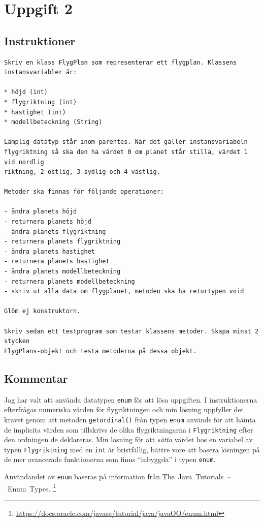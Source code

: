 \section{Uppgift 2}\label{sec:uppg02}

\subsection{Instruktioner}
\begin{Verbatim}[fontsize=\small]
Skriv en klass FlygPlan som representerar ett flygplan. Klassens
instansvariabler är:

* höjd (int)
* flygriktning (int)
* hastighet (int)
* modellbeteckning (String)

Lämplig datatyp står inom parentes. När det gäller instansvariabeln
flygriktning så ska den ha värdet 0 om planet står stilla, värdet 1 vid nordlig
riktning, 2 ostlig, 3 sydlig och 4 västlig.

Metoder ska finnas för följande operationer:

- ändra planets höjd
- returnera planets höjd
- ändra planets flygriktning
- returnera planets flygriktning
- ändra planets hastighet
- returnera planets hastighet
- ändra planets modellbeteckning
- returnera planets modellbeteckning
- skriv ut alla data om flygplanet, metoden ska ha returtypen void

Glöm ej konstruktorn.

Skriv sedan ett testprogram som testar klassens metoder. Skapa minst 2 stycken
FlygPlans-objekt och testa metoderna på dessa objekt.
\end{Verbatim}


\subsection{Kommentar}
Jag har valt att använda datatypen \texttt{enum} för att lösa uppgiften.  I
instruktionerna efterfrågas numeriska värden för flygriktningen och min lösning
uppfyller det kravet genom att metoden \texttt{getordinal()} från typen
\texttt{enum} används för att hämta de implicita värden som tillskrivs de olika
flygriktningarna i \texttt{Flygriktning} efter den ordningen de deklareras.
Min lösning för att \emph{sätta} värdet hos en variabel av typen
\texttt{Flygriktning} med en \texttt{int} är bristfällig, bättre vore att
basera lösningen på de mer avancerade funktionerna som finns ``inbyggda'' i
typen \texttt{enum}.

Användandet av \texttt{enum} baseras på information från
\mbox{The Java Tutorials -- Enum Types}.
\footnote{\url{https://docs.oracle.com/javase/tutorial/java/javaOO/enum.html}}


